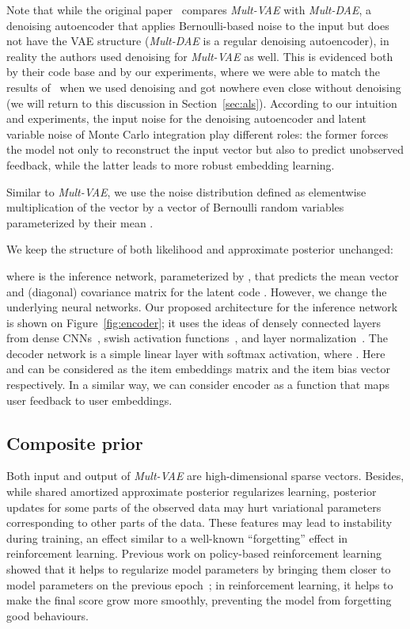 \documentclass[sigconf,authorversion]{acmart}
\begin{document}
Note that while the original paper~\cite{liang2018variational} compares \emph{Mult-VAE} with \emph{Mult-DAE}, a denoising autoencoder that applies Bernoulli-based noise to the input but does not have the VAE structure (\emph{Mult-DAE} is a regular denoising autoencoder), in reality the authors used denoising for \emph{Mult-VAE} as well. This is evidenced both by their code base and by our experiments, where we were able to match the results of~\cite{liang2018variational} when we used denoising and got nowhere even close without denoising (we will return to this discussion in Section~\ref{sec:als}). According to our intuition and experiments, the input noise for the denoising autoencoder and latent variable noise of Monte Carlo integration play different roles: the former forces the model not only to reconstruct the input vector but also to predict unobserved feedback, while the latter leads to more robust embedding learning.





Similar to \emph{Mult-VAE}, we use the noise distribution  defined as elementwise multiplication of the vector  by a vector of Bernoulli random variables parameterized by their mean .

We keep the structure of both likelihood and approximate posterior unchanged: 

where  is the inference network, parameterized by , that predicts the mean vector and (diagonal) covariance matrix for the latent code . However, we change the underlying neural networks. Our proposed architecture for the inference network is shown on Figure~\ref{fig:encoder}; it uses the ideas of densely connected layers from dense CNNs~\cite{DBLP:journals/corr/HuangLW16a}, swish activation functions~\cite{DBLP:conf/iclr/RamachandranZL18}, and layer normalization~\cite{2016arXiv160706450L}. The decoder network is a simple linear layer with softmax activation, where .
Here  and  can be considered as the item embeddings matrix and the item bias vector respectively. In a similar way, we can consider encoder  as a function that maps user feedback to user embeddings.

\subsection{Composite prior}\label{sec:prior}

Both input and output of \emph{Mult-VAE} are high-dimensional sparse vectors. Besides, while shared amortized approximate posterior regularizes learning, posterior updates for some parts of the observed data may hurt variational parameters corresponding to other parts of the data. These features may lead to instability during training, an effect similar to a well-known ``forgetting'' effect in reinforcement learning.  Previous work on policy-based reinforcement learning showed that it helps to regularize model parameters by bringing them closer to model parameters on the previous epoch~\cite{DBLP:journals/corr/SchulmanWDRK17,houthooft2016vime}; in reinforcement learning, it helps to make the final score grow more smoothly, preventing the model from forgetting good behaviours.
\end{document}
